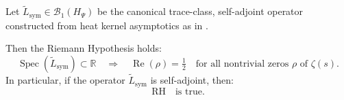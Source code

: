 \begin{theorem}
\label{thm:truth_of_rh_from_trace_asymptotics}
Let $\tilde{L}_{\mathrm{sym}} \in \mathcal{B}_1(H_\Psi)$ be the canonical trace-class, self-adjoint operator constructed from heat kernel asymptotics as in .

Then the Riemann Hypothesis holds:
\[
\operatorname{Spec}(\tilde{L}_{\mathrm{sym}}) \subset \mathbb{R} \quad \Longrightarrow \quad \operatorname{Re}(\rho) = \tfrac{1}{2} \quad \text{for all nontrivial zeros } \rho \text{ of } \zeta(s).
\]
In particular, if the operator $\tilde{L}_{\mathrm{sym}}$ is self-adjoint, then:
\[
\text{RH} \quad \text{is true}.
\]
\end{theorem}
